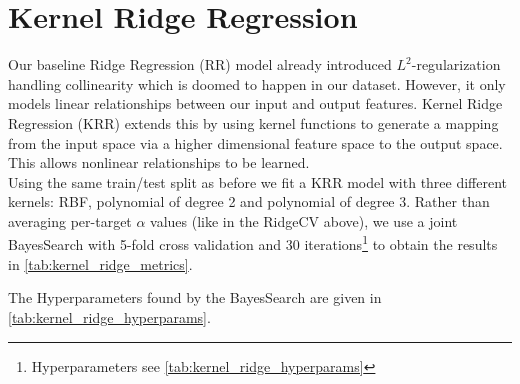 \section{Kernel Ridge Regression}
\label{sec:kernel_ridge_regression}
Our baseline Ridge Regression (RR) model already introduced $L^2$-regularization handling collinearity which is doomed to happen in our dataset. However, it only models linear relationships between our input and output features. Kernel Ridge Regression (KRR) extends this by using kernel functions to generate a mapping from the input space via a higher dimensional feature space to the output space. This allows nonlinear relationships to be learned. \\
Using the same train/test split as before we fit a KRR model with three different kernels: RBF, polynomial of degree 2 and polynomial of degree 3. 
Rather than averaging per-target $\alpha$ values (like in the RidgeCV above), we use a joint BayesSearch with 5-fold cross validation and 30 iterations\footnote{Hyperparameters see \autoref{tab:kernel_ridge_hyperparams}} to obtain the results in \autoref{tab:kernel_ridge_metrics}.

\begin{table}[h]
    \centering
    \caption[ subset - iterations to convergence Kernel Ridge regression]{Comparison of different Kernel Ridge regression (KRR) guessing schemes for 102 (20\%) test samples from the  subset from QM9 \parencite{ref:article1_qm9}. The F-score is calculated using the Fock matrix prediction from the Kernel-Ridge regression model and the \texttt{minao} guess. The number of iterations until convergence is shown as well as the percentage samples not converging within 50 iterations and the inference time as a factor of the inference time of the \texttt{minao} guess.}
    \label{tab:kernel_ridge_metrics}
\end{table}
The Hyperparameters found by the BayesSearch are given in \autoref{tab:kernel_ridge_hyperparams}.

